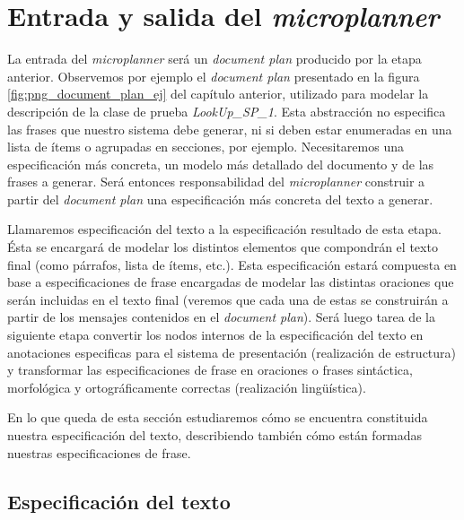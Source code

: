 

\section{Entrada y salida del \textit{microplanner}}
La entrada del \textit{microplanner} será un \textit{document plan} producido por la etapa anterior. Observemos por ejemplo el \textit{document plan} presentado en la figura \ref{fig:png_document_plan_ej} del capítulo anterior, utilizado para modelar la descripción de la clase de prueba \emph{LookUp\_SP\_1}. Esta abstracción no especifica las frases que nuestro sistema debe generar, ni si deben estar enumeradas en una lista de ítems o agrupadas en secciones, por ejemplo. Necesitaremos una especificación más concreta, un modelo más detallado del documento y de las frases a generar. Será entonces responsabilidad del \textit{microplanner}  construir a partir del \textit{document plan} una especificación más concreta del texto a generar.

Llamaremos especificación del texto a la especificación resultado de esta etapa. Ésta se encargará de modelar los distintos elementos que compondrán el texto final (como párrafos, lista de ítems, etc.). Esta especificación estará compuesta en base a especificaciones de frase encargadas de modelar las distintas oraciones que serán incluidas en el texto final (veremos que cada una de estas se construirán a partir de los mensajes contenidos en el \textit{document plan}). Será luego tarea de la siguiente etapa convertir los nodos internos de la especificación del texto en anotaciones especificas para el sistema de presentación (realización de estructura) y transformar las especificaciones de frase en oraciones o frases sintáctica, morfológica y ortográficamente correctas (realización lingüística). 


En lo que queda de esta sección estudiaremos cómo se encuentra constituida nuestra especificación del texto, describiendo también cómo están formadas nuestras especificaciones de frase.

\subsection{Especificación del texto}

